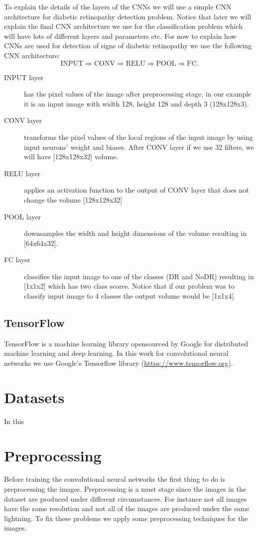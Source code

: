 To explain the details of the layers of the CNNs we will use a simple CNN architecture for diabetic retinopathy detection problem. Notice that later we will explain the final CNN architecture we use for the classification problem which will have lots of different layers and parameters etc. For now to explain how CNNs are used for detection of signs of diabetic retinopathy we use the following CNN architecture:
\[
\text{INPUT} \Rightarrow \text{CONV} \Rightarrow \text{RELU} \Rightarrow \text{POOL} \Rightarrow \text{FC}.
\]

\begin{description}
    \item[INPUT layer] has the pixel values of the image after preprocessing stage, in our example it is an input image with width 128, height 128 and depth 3 (128x128x3).
    \item[CONV layer] transforms the pixel values of the local regions of the input image by using input neurons' weight and biases. After CONV layer if we use 32 filters, we will have [128x128x32] volume.
    \item[RELU layer] applies an activation function to the output of CONV layer that does not change the volume [128x128x32]
    \item[POOL layer] downsamples the width and height dimensions of the volume resulting in [64x64x32].
    \item[FC layer] classifies the input image to one of the classes (DR and NoDR) resulting in [1x1x2] which has two class scores. Notice that if our problem was to classify input image to 4 classes the output volume would be [1x1x4].
\end{description}


\subsection{TensorFlow}
TensorFlow is a machine learning library opensourced by Google for distributed machine learning and deep learning. In this work for convolutional neural networks we use Google's Tensorflow library (\url{https://www.tensorflow.org}).

\section{Datasets}

In this 

\section{Preprocessing}
Before training the convolutional neural networks the first thing to do is preprocessing the images. Preprocessing is a must stage since the images in the dataset are produced under different circumstances. For instance not all images have the same resolution and not all of the images are produced under the same lightning. To fix these problems we apply some preprocessing techniques for the images. 

